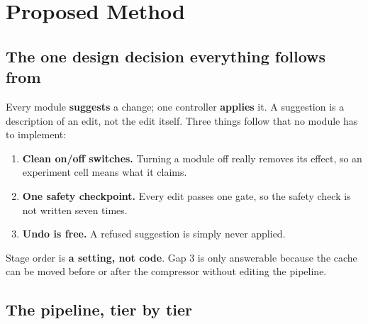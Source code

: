 \documentclass[11pt,a4paper]{article}
\begin{document}
\section{Proposed Method}

\subsection{The one design decision everything follows from}
Every module \textbf{suggests} a change; one controller \textbf{applies} it. A
suggestion is a description of an edit, not the edit itself. Three things follow that
no module has to implement:

\begin{enumerate}
\item \textbf{Clean on/off switches.} Turning a module off really removes its effect,
so an experiment cell means what it claims.
\item \textbf{One safety checkpoint.} Every edit passes one gate, so the safety check
is not written seven times.
\item \textbf{Undo is free.} A refused suggestion is simply never applied.
\end{enumerate}

Stage order is \textbf{a setting, not code}. Gap 3 is only answerable because the
cache can be moved before or after the compressor without editing the pipeline.

\subsection{The pipeline, tier by tier}
\end{document}
